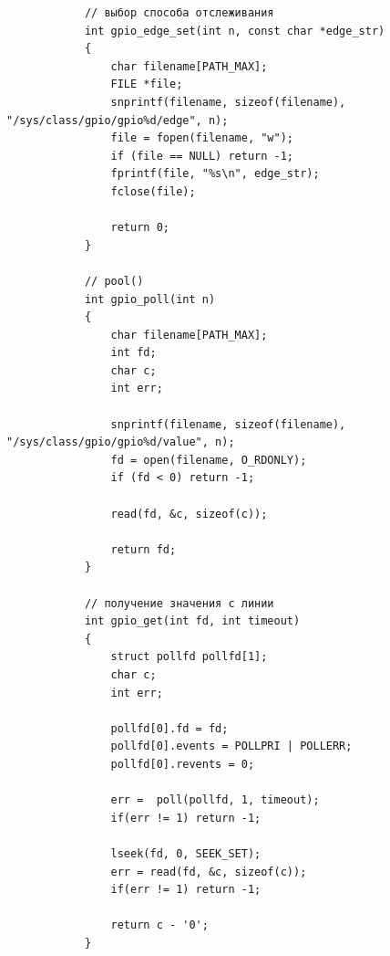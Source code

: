 \documentclass[a4paper,12pt]{report} %
\begin{document}
			\begin{verbatim}
			// выбор способа отслеживания
			int gpio_edge_set(int n, const char *edge_str)
			{
			    char filename[PATH_MAX];
			    FILE *file;
			    snprintf(filename, sizeof(filename), "/sys/class/gpio/gpio%d/edge", n);
			    file = fopen(filename, "w");
			    if (file == NULL) return -1;
			    fprintf(file, "%s\n", edge_str);
			    fclose(file);
			
			    return 0;
			}
			
			// pool()
			int gpio_poll(int n)
			{
			    char filename[PATH_MAX];
			    int fd;
			    char c;
			    int err;
			
			    snprintf(filename, sizeof(filename), "/sys/class/gpio/gpio%d/value", n);
			    fd = open(filename, O_RDONLY);
			    if (fd < 0) return -1;
			
			    read(fd, &c, sizeof(c));
			
			    return fd;
			}
			
			// получение значения с линии
			int gpio_get(int fd, int timeout)
			{
			    struct pollfd pollfd[1];
			    char c;
			    int err;
			
			    pollfd[0].fd = fd;
			    pollfd[0].events = POLLPRI | POLLERR;
			    pollfd[0].revents = 0;
			
			    err =  poll(pollfd, 1, timeout);
			    if(err != 1) return -1;
			
			    lseek(fd, 0, SEEK_SET);
			    err = read(fd, &c, sizeof(c));
			    if(err != 1) return -1;
			
			    return c - '0';
			}
			\end{verbatim} 
		
		
\end{document}

